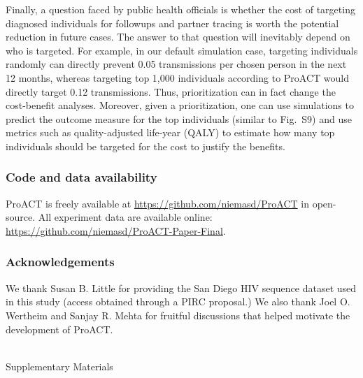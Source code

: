 \documentclass[a4paper,11pt]{article}
\newcommand{\beginsupplement}{%
        \setcounter{table}{0}
        \renewcommand{\thetable}{S\arabic{table}}%
        \setcounter{figure}{0}
        \renewcommand{\thefigure}{S\arabic{figure}}%
        \setcounter{section}{0}
        \renewcommand{\thesection}{S\arabic{section}}%
        \clearpage%
        \begin{center}
        ~\\{Supplementary Materials}\\~\\
        \end{center}
}
\begin{document}
Finally, a question faced by public health officials is whether the cost of targeting diagnosed individuals for followups and partner tracing is worth the potential reduction in future cases. 
The answer to that question will inevitably depend on who is targeted.
For example, in our default simulation case, targeting individuals randomly can directly prevent 0.05 transmissions per chosen person  in the next 12 months, whereas targeting top 1,000 individuals according to ProACT would directly target 0.12 transmissions. 
Thus, prioritization can in fact change the cost-benefit analyses. 
Moreover, given a prioritization, one can use simulations to predict the outcome measure for the top individuals (similar to Fig.~S9) and use metrics such as quality-adjusted life-year (QALY) to estimate how many top individuals should be targeted for the cost to justify the benefits.

\subsubsection*{Code and data availability}
ProACT is freely available at \url{https://github.com/niemasd/ProACT} in open-source.
All experiment data are available online: \url{https://github.com/niemasd/ProACT-Paper-Final}.


\subsubsection*{Acknowledgements}
We thank Susan B. Little for providing the San Diego HIV sequence dataset used in this study (access obtained through a  PIRC proposal.)
We also thank Joel O. Wertheim and Sanjay R. Mehta for fruitful discussions that helped motivate the development of ProACT.



\bigskip\bigskip

\printbibliography

\beginsupplement
\end{document}
